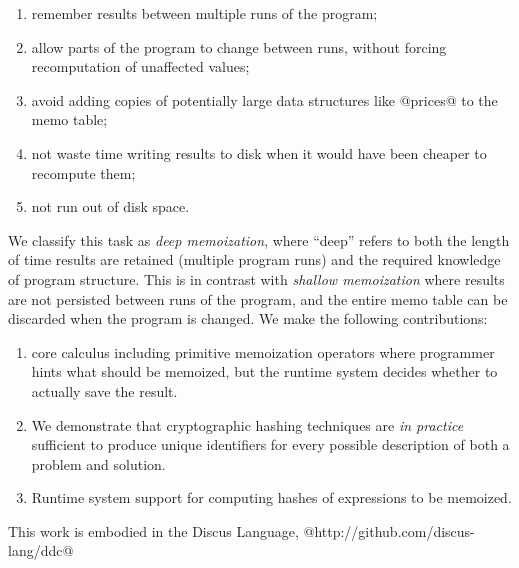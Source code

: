 \begin{enumerate}
\item remember results between multiple runs of the program;
\item allow parts of the program to change between runs, without forcing recomputation of unaffected values;
\item avoid adding copies of potentially large data structures like @prices@ to the memo table;
\item not waste time writing results to disk when it would have been cheaper to recompute them;
\item not run out of disk space.
\end{enumerate}

We classify this task as \emph{deep memoization}, where ``deep'' refers to both the length of time results are retained (multiple program runs) and the required knowledge of program structure. This is in contrast with \emph{shallow memoization} where results are not persisted between runs of the program, and the entire memo table can be discarded when the program is changed. We make the following contributions:

\begin{enumerate}
\item core calculus including primitive memoization operators where programmer hints what should be memoized, but the runtime system decides whether to actually save the result.

\item We demonstrate that cryptographic hashing techniques are \emph{in practice} sufficient to produce unique identifiers for every possible description of both a problem and solution.

\item Runtime system support for computing hashes of expressions to be memoized.

\end{enumerate}

This work is embodied in the Discus Language, @http://github.com/discus-lang/ddc@
